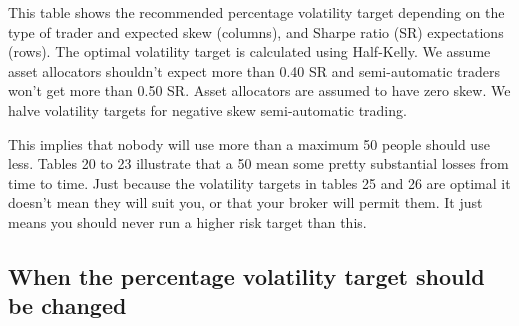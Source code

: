  

This table shows the recommended percentage volatility target depending on the type of trader and expected skew (columns), and Sharpe ratio (SR) expectations (rows). The optimal volatility target is calculated using Half-Kelly. We assume asset allocators shouldn’t expect more than 0.40 SR and semi-automatic traders won’t get more than 0.50 SR. Asset allocators are assumed to have zero skew. We halve volatility targets for negative skew semi-automatic trading.

This implies that nobody will use more than a maximum 50%
people should use less. Tables 20 to 23 illustrate that a 50%
mean some pretty substantial losses from time to time. Just because the volatility targets in tables 25 and 26 are optimal it doesn’t mean they will suit you, or that your broker will permit them. It just means you should never run a higher risk target than this.

\subsection*{When the percentage volatility target should be changed}

